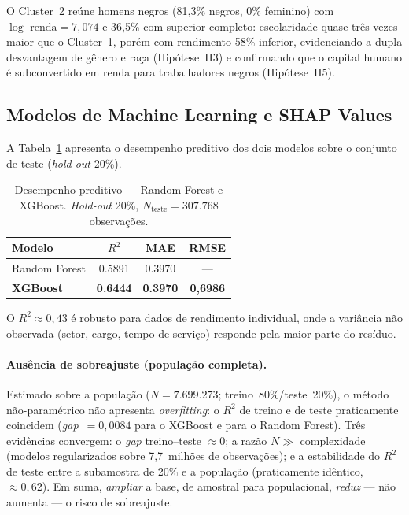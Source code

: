 \documentclass[12pt, a4paper, oneside]{article}
\begin{document}
O Cluster~2 reúne homens negros (81,3\% negros,
0\% feminino) com
$\log\text{-renda}=7,074$ e 36,5\%
com superior completo: escolaridade quase três vezes maior que o Cluster~1,
porém com rendimento 58\%
inferior, evidenciando a dupla desvantagem de gênero e raça
(Hipótese~H3) e confirmando que o capital humano é subconvertido em renda
para trabalhadores negros (Hipótese~H5).

\subsection{Modelos de Machine Learning e SHAP Values}
\label{subsec:ml}

A Tabela~\ref{tab:ml_perf} apresenta o desempenho preditivo dos dois modelos
sobre o conjunto de teste (\textit{hold-out} 20\%).

\begin{table}[H]
\centering
\caption{Desempenho preditivo --- Random Forest e XGBoost.
          \textit{Hold-out} 20\%, $N_\text{teste}=307.768$ observações.}
\label{tab:ml_perf}
\begin{tabular}{lccc}
\toprule
\textbf{Modelo} & $R^2$ & \textbf{MAE} & \textbf{RMSE} \\
\midrule
Random Forest  & 0.5891  & 0.3970 & --- \\
\textbf{XGBoost}      & \textbf{0.6444} & \textbf{0.3970} & \textbf{0,6986} \\
\bottomrule
\end{tabular}
\end{table}

O $R^2 \approx 0{,}43$ é robusto para dados de rendimento individual,
onde a variância não observada (setor, cargo, tempo de serviço) responde
pela maior parte do resíduo.

\paragraph{Ausência de sobreajuste (população completa).}
Estimado sobre a população (\mbox{$N=7.699.273$}; treino~80\%/teste~20\%),
o método não-paramétrico não apresenta \textit{overfitting}: o $R^2$ de treino e de
teste praticamente coincidem (\textit{gap}~$=0,0084$ para o XGBoost e
para o Random Forest). Três evidências convergem: o \textit{gap} treino--teste
$\approx 0$; a razão $N \gg$ complexidade (modelos regularizados sobre 7,7~milhões de
observações); e a estabilidade do $R^2$ de teste entre a subamostra de 20\% e a
população (praticamente idêntico, $\approx 0{,}62$). Em suma, \emph{ampliar} a base,
de amostral para populacional, \emph{reduz} --- não aumenta --- o risco de sobreajuste.
\end{document}
